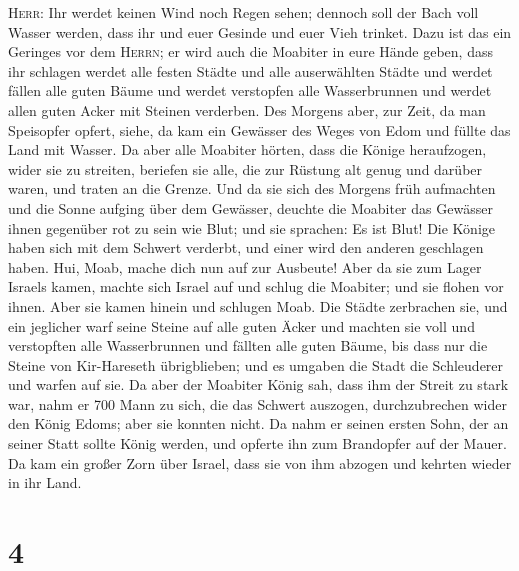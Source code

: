 \textsc{Herr}: Ihr werdet keinen Wind noch Regen sehen; dennoch soll der
Bach voll Wasser werden, dass ihr und euer Gesinde und euer Vieh
trinket.  Dazu ist das ein Geringes vor dem
\textsc{Herrn}; er wird auch die Moabiter in eure Hände geben,
 dass ihr schlagen werdet alle festen Städte und alle
auserwählten Städte und werdet fällen alle guten Bäume und werdet
verstopfen alle Wasserbrunnen und werdet allen guten Acker mit Steinen
verderben.  Des Morgens aber, zur Zeit, da man Speisopfer
opfert, siehe, da kam ein Gewässer des Weges von Edom und füllte das
Land mit Wasser.  Da aber alle Moabiter hörten, dass die
Könige heraufzogen, wider sie zu streiten, beriefen sie alle, die zur
Rüstung alt genug und darüber waren, und traten an die Grenze.
 Und da sie sich des Morgens früh aufmachten und die
Sonne aufging über dem Gewässer, deuchte die Moabiter das Gewässer ihnen
gegenüber rot zu sein wie Blut;  und sie sprachen: Es ist
Blut! Die Könige haben sich mit dem Schwert verderbt, und einer wird den
anderen geschlagen haben. Hui, Moab, mache dich nun auf zur Ausbeute!
 Aber da sie zum Lager Israels kamen, machte sich Israel
auf und schlug die Moabiter; und sie flohen vor ihnen. Aber sie kamen
hinein und schlugen Moab.  Die Städte zerbrachen sie, und
ein jeglicher warf seine Steine auf alle guten Äcker und machten sie
voll und verstopften alle Wasserbrunnen und fällten alle guten Bäume,
bis dass nur die Steine von Kir-Hareseth übrigblieben; und es umgaben
die Stadt die Schleuderer und warfen auf sie.  Da aber
der Moabiter König sah, dass ihm der Streit zu stark war, nahm er 700
Mann zu sich, die das Schwert auszogen, durchzubrechen wider den König
Edoms; aber sie konnten nicht.  Da nahm er seinen ersten
Sohn, der an seiner Statt sollte König werden, und opferte ihn zum
Brandopfer auf der Mauer. Da kam ein großer Zorn über Israel, dass sie
von ihm abzogen und kehrten wieder in ihr Land.

\hypertarget{section-3}{%
\section{4}\label{section-3}}

